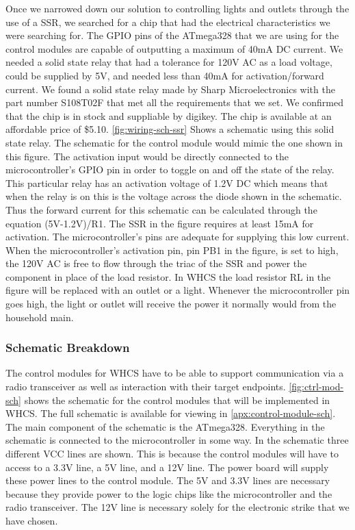 Once we narrowed down our solution to controlling lights and outlets through
the use of a SSR, we searched for a chip that had the electrical
characteristics we were searching for. The GPIO pins of the ATmega328 that we
are using for the control modules are capable of outputting a maximum of 40mA
DC current. We needed a solid state relay that had a tolerance for 120V AC as a
load voltage, could be supplied by 5V, and needed less than 40mA for
activation/forward current. We found a solid state relay made by Sharp
Microelectronics with the part number S108T02F that met all the requirements
that we set. We confirmed that the chip is in stock and suppliable by digikey.
The chip is available at an affordable price of \$5.10. \autoref{fig:wiring-sch-ssr}
Shows a schematic using this solid state relay. The schematic for the control
module would mimic the one shown in this figure. The activation input would be
directly connected to the microcontroller{}'s GPIO pin in order to toggle on
and off the state of the relay. This particular relay has an activation voltage
of 1.2V DC which means that when the relay is on this is the voltage across the
diode shown in the schematic. Thus the forward current for this schematic can
be calculated through the equation (5V{}-1.2V)/R1. The SSR in the figure
requires at least 15mA for activation. The microcontroller{}'s pins are
adequate for supplying this low current. When the microcontroller{}'s
activation pin, pin PB1 in the figure, is set to high, the 120V AC is free to
flow through the triac of the SSR and power the component in place of the load
resistor. In WHCS the load resistor RL in the figure will be replaced with an
outlet or a light. Whenever the microcontroller pin goes high, the light or
outlet will receive the power it normally would from the household main.


\subsubsection{Schematic Breakdown}
The control modules for WHCS have to be able to support communication via a
radio transceiver as well as interaction with their target endpoints.
\autoref{fig:ctrl-mod-sch} shows the schematic for the control modules that will be
implemented in WHCS. The full schematic is available for viewing in \autoref{apx:control-module-sch}. The main component of the schematic is the ATmega328.
Everything in the schematic is connected to the microcontroller in some way. In
the schematic three different VCC lines are shown. This is because the control
modules will have to access to a 3.3V line, a 5V line, and a 12V line. The
power board will supply these power lines to the control module. The 5V and
3.3V lines are necessary because they provide power to the logic chips like the
microcontroller and the radio transceiver. The 12V line is necessary solely for
the electronic strike that we have chosen.

